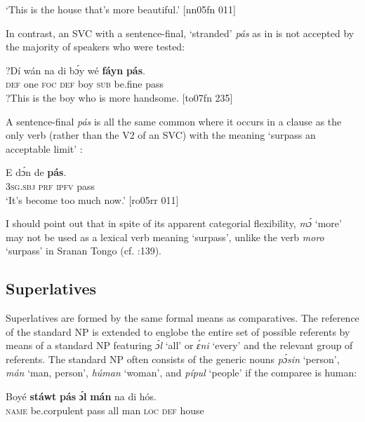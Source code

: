 \glt ‘This is the house that’s more beautiful.’ [nn05fn 011]
\z

In contrast, an SVC with a sentence-final, ‘stranded’ \textit{pás} as in  is not accepted by the majority of speakers who were tested: 


\ea%
    \label{ex:key:487}
    \gll ?Dí  wán  na  di  bɔ́y  wé  \textbf{fáyn}  \textbf{pás}.\\
 \textsc{def}  one  \textsc{foc}  \textsc{def}  boy  \textsc{sub}  be.fine  pass\\

\glt ?This is the boy who is more handsome. [to07fn 235]
\z

A sentence-final \textit{pás} is all the same common where it occurs in a clause as the only verb (rather than the V2 of an SVC) with the meaning ‘surpass an acceptable limit’ : 


\ea%
    \label{ex:key:488}
    \gll E    dɔ́n  de  \textbf{pás}.\\
\textsc{3sg.sbj}  \textsc{prf}  \textsc{ipfv}  pass\\

\glt ‘It’s become too much now.’ [ro05rr 011]
\z

I should point out that in spite of its apparent categorial flexibility, \textit{mɔ́} ‘more’ may not be used as a lexical verb meaning ‘surpass’, unlike the verb \textit{moro} ‘surpass’ in Sranan Tongo (cf. \citealt{BlankerDubbeldam2010}:139).

\subsection{Superlatives}

Superlatives are formed by the same formal means as comparatives. The reference of the standard NP is extended to englobe the entire set of possible referents by means of a standard NP featuring \textit{ɔ́l} ‘all’ or \textit{ɛ́ni} ‘every’ and the relevant group of referents. The standard NP often consists of the generic noun{\fff}s \textit{pɔ́sin} ‘person’, \textit{mán} ‘man, person’, \textit{húman} ‘woman’, and \textit{pípul} ‘people’ if the comparee is human:


\ea%
    \label{ex:key:489}
    \gll Boyé  \textbf{stáwt}    \textbf{pás}  \textbf{ɔ́l}  \textbf{mán}  na  di  hós.\\
\textsc{name}  be.corpulent  pass  all  man    \textsc{loc}  \textsc{def}  house\\

